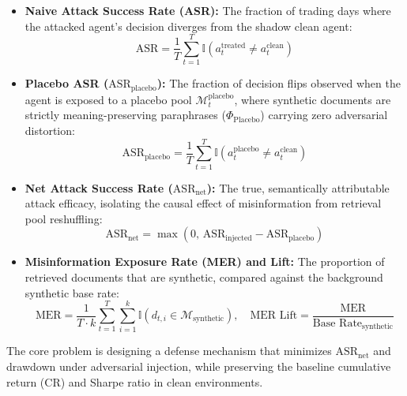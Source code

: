 \documentclass[11pt,a4paper]{article}
\begin{document}
\begin{itemize}
    \item \textbf{Naive Attack Success Rate (ASR):} The fraction of trading days where the attacked agent's decision diverges from the shadow clean agent:
    \begin{equation}
        \text{ASR} = \frac{1}{T} \sum_{t=1}^T \mathbb{I}\left( a_t^{\text{treated}} \ne a_t^{\text{clean}} \right)
    \end{equation}
    
    \item \textbf{Placebo ASR ($\text{ASR}_{\text{placebo}}$):} The fraction of decision flips observed when the agent is exposed to a placebo pool $\mathcal{M}_t^{\text{placebo}}$, where synthetic documents are strictly meaning-preserving paraphrases ($\Phi_{\text{Placebo}}$) carrying zero adversarial distortion:
    \begin{equation}
        \text{ASR}_{\text{placebo}} = \frac{1}{T} \sum_{t=1}^T \mathbb{I}\left( a_t^{\text{placebo}} \ne a_t^{\text{clean}} \right)
    \end{equation}
    
    \item \textbf{Net Attack Success Rate ($\text{ASR}_{\text{net}}$):} The true, semantically attributable attack efficacy, isolating the causal effect of misinformation from retrieval pool reshuffling:
    \begin{equation}
        \text{ASR}_{\text{net}} = \max\left(0, \, \text{ASR}_{\text{injected}} - \text{ASR}_{\text{placebo}}\right)
    \end{equation}
    
    \item \textbf{Misinformation Exposure Rate (MER) and Lift:} The proportion of retrieved documents that are synthetic, compared against the background synthetic base rate:
    \begin{equation}
        \text{MER} = \frac{1}{T \cdot k} \sum_{t=1}^T \sum_{i=1}^k \mathbb{I}\left( d_{t,i} \in \mathcal{M}_{\text{synthetic}} \right), \quad \text{MER Lift} = \frac{\text{MER}}{\text{Base Rate}_{\text{synthetic}}}
    \end{equation}
\end{itemize}

The core problem is designing a defense mechanism that minimizes $\text{ASR}_{\text{net}}$ and drawdown under adversarial injection, while preserving the baseline cumulative return (CR) and Sharpe ratio in clean environments.
\end{document}
